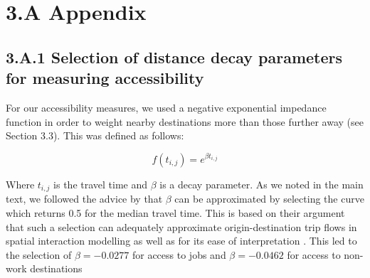 \section*{3.A \hspace{1mm} Appendix}

\subsection*{3.A.1 \hspace{2mm} Selection of distance decay parameters for measuring accessibility}


For our accessibility measures, we used a negative exponential impedance function in order to weight nearby destinations more than those further away (see Section 3.3). This was defined as follows:

\[f(t_{i,j}) = e^{\beta t_{i,j}}\]

Where $t_{i,j}$ is the travel time and $\beta$ is a decay parameter. As we noted in the main text, we followed the advice by  that $\beta$ can be approximated by selecting the curve which returns 0.5 for the median travel time. This is based on their argument that such a selection can adequately approximate origin-destination trip flows in spatial interaction modelling as well as for its ease of interpretation \cite{osth_new_2016}. This led to the selection of $\beta = -0.0277$ for access to jobs and $\beta = -0.0462$ for access to non-work destinations

